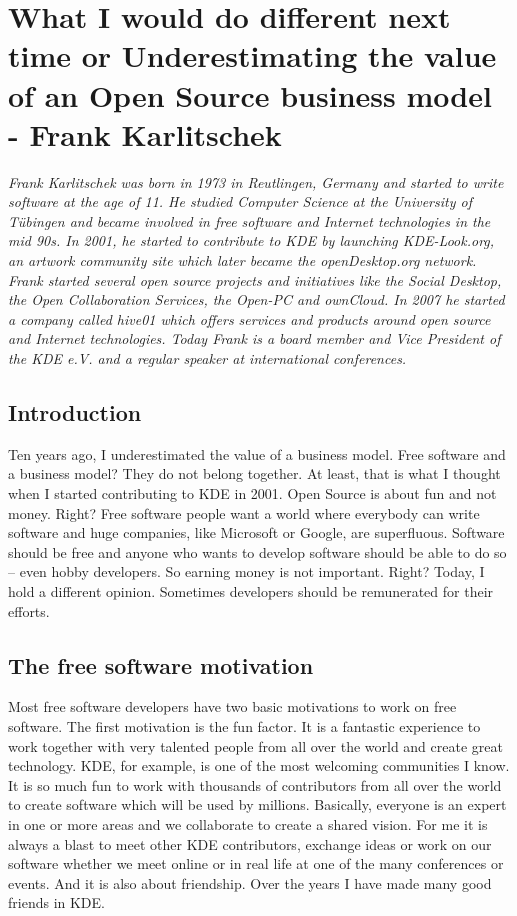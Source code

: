 \chapter{What I would do different next time or Underestimating the value of an
Open Source business model - Frank Karlitschek}

\textit{Frank Karlitschek was born in 1973 in Reutlingen, Germany and started to
write software at the age of 11. He studied Computer Science at the University
of T\"ubingen and became involved in free software and Internet technologies in
the mid 90s. In 2001, he started to contribute to KDE by launching KDE-Look.org,
an artwork community site which later became the openDesktop.org network. Frank
started several open source projects and initiatives like the Social Desktop,
the Open Collaboration Services, the Open-PC and ownCloud. In 2007 he started a
company called hive01 which offers services and products around open source and
Internet technologies.
Today Frank is a board member and Vice President of the KDE e.V. and a regular
speaker at international conferences.}

\section*{Introduction}

Ten years ago, I underestimated the value of a business model. Free software and
a business model? They do not belong together. At least, that is what I thought
when I started contributing to KDE in 2001. Open Source is about fun and not
money. Right? Free software people want a world where everybody can write
software and huge companies, like Microsoft or Google, are superfluous. Software
should be free and anyone who wants to develop software should be able to do so
-- even hobby developers. So earning money is not important. Right? Today, I
hold a different opinion. Sometimes developers should be remunerated for their
efforts.  

\section*{The free software motivation}

Most free software developers have two basic motivations to work on free
software. The first motivation is the fun factor. It is a fantastic experience
to work together with very talented people from all over the world and create
great technology. KDE, for example, is one of the most welcoming communities I
know. It is so much fun to work with thousands of contributors from all over the
world to create software which will be used by millions. Basically, everyone is
an expert in one or more areas and we collaborate to create a shared vision. For
me it is always a blast to meet other KDE contributors, exchange ideas or work
on our software whether we meet online or in real life at one of the many
conferences or events. And it is also about friendship. Over the years I have
made many good friends in KDE.

